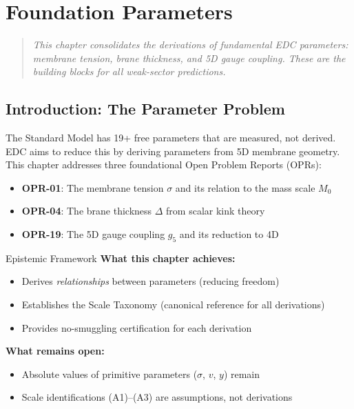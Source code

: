 \chapter{Foundation Parameters}
\label{ch:foundation_params}

\begin{quote}
\textit{This chapter consolidates the derivations of fundamental EDC parameters:
membrane tension, brane thickness, and 5D gauge coupling. These are the building
blocks for all weak-sector predictions.}
\end{quote}

\section{Introduction: The Parameter Problem}
\label{sec:foundation_intro}

The Standard Model has 19+ free parameters that are measured, not derived. EDC aims
to reduce this by deriving parameters from 5D membrane geometry. This chapter addresses
three foundational Open Problem Reports (OPRs):

\begin{itemize}[nosep]
\item \textbf{OPR-01}: The membrane tension $\sigma$ and its relation to the mass scale $M_0$
\item \textbf{OPR-04}: The brane thickness $\Delta$ from scalar kink theory
\item \textbf{OPR-19}: The 5D gauge coupling $g_5$ and its reduction to 4D
\end{itemize}

\begin{statusbox}{Epistemic Framework}
\textbf{What this chapter achieves:}
\begin{itemize}[nosep]
\item Derives \emph{relationships} between parameters (reducing freedom) \tagDc{}
\item Establishes the Scale Taxonomy (canonical reference for all derivations)
\item Provides no-smuggling certification for each derivation
\end{itemize}

\textbf{What remains open:}
\begin{itemize}[nosep]
\item Absolute values of primitive parameters ($\sigma$, $v$, $y$) remain \tagP{}
\item Scale identifications (A1)--(A3) are assumptions, not derivations
\end{itemize}
\end{statusbox}


